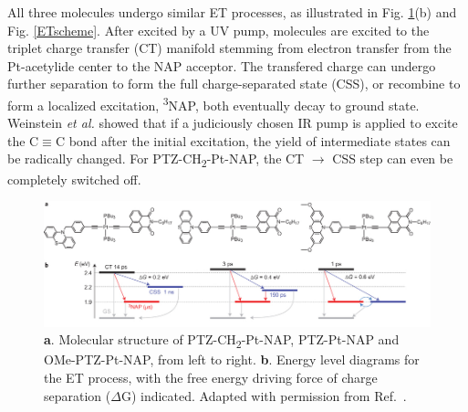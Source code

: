 All three molecules undergo similar ET processes, as illustrated in Fig. \ref{JuliaStruct}(b) and Fig. \ref{ETscheme}. After excited by a UV pump, molecules are excited to the triplet charge transfer (CT) manifold stemming from electron transfer from the Pt-acetylide center to the NAP acceptor. The transfered charge can undergo further separation to form the full charge-separated state (CSS), or recombine to form a localized excitation, \textsuperscript{3}NAP, both eventually decay to ground state. Weinstein {\em et al.} showed that if a judiciously chosen IR pump is applied to excite the C$\equiv$C bond after the initial excitation, the yield of intermediate states can be radically changed. For PTZ-CH\textsubscript{2}-Pt-NAP, the CT $\rightarrow$ CSS step can even be completely switched off.


\begin{figure}[!t]
\includegraphics[width=\columnwidth]{Chapters/chap4/Images/molecules.jpg}
\caption{\textbf{a}. Molecular structure of PTZ-CH\textsubscript{2}-Pt-NAP, PTZ-Pt-NAP and OMe-PTZ-Pt-NAP, from left to right. \textbf{b}. Energy level diagrams for the ET process, with the free energy driving force of charge separation ($\Delta$G) indicated. Adapted with permission from Ref.~\cite{delor2015mechanism}.\label{JuliaStruct}}
\end{figure}

